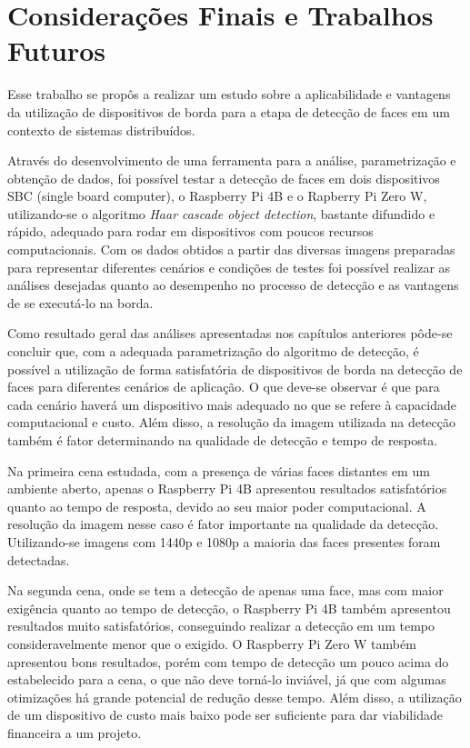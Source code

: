 \chapter{Considerações Finais e Trabalhos \mbox{Futuros}}\label{cap:conclusao}
\thispagestyle{plain}

Esse trabalho se propôs a realizar um estudo sobre a aplicabilidade e vantagens da utilização de dispositivos de borda para a etapa de detecção de faces em um contexto de sistemas distribuídos.

Através do desenvolvimento de uma ferramenta para a análise, parametrização e obtenção de dados, foi possível testar a detecção de faces em dois dispositivos SBC (single board computer), o Raspberry Pi 4B e o Rapberry Pi Zero W, utilizando-se o algoritmo \textit{Haar cascade object detection}, bastante difundido e rápido, adequado para rodar em dispositivos com poucos recursos computacionais. Com os dados obtidos a partir das diversas imagens preparadas para representar diferentes cenários e condições de testes foi possível realizar as análises desejadas quanto ao desempenho no processo de detecção e as vantagens de se executá-lo na borda.

Como resultado geral das análises apresentadas nos capítulos anteriores pôde-se concluir que, com a adequada parametrização do algoritmo de detecção, é possível a utilização de forma satisfatória de dispositivos de borda na detecção de faces para diferentes cenários de aplicação. O que deve-se observar é que para cada cenário haverá um dispositivo mais adequado no que se refere à capacidade computacional e custo. Além disso, a resolução da imagem utilizada na detecção também é fator determinando na qualidade de detecção e tempo de resposta.

Na primeira cena estudada, com a presença de várias faces distantes em um ambiente aberto, apenas o Raspberry Pi 4B apresentou resultados satisfatórios quanto ao tempo de resposta, devido ao seu maior poder computacional. A resolução da imagem nesse caso é fator importante na qualidade da detecção. Utilizando-se imagens com 1440p e 1080p a maioria das faces presentes foram detectadas.

Na segunda cena, onde se tem a detecção de apenas uma face, mas com maior exigência quanto ao tempo de detecção, o Raspberry Pi 4B também apresentou resultados muito satisfatórios, conseguindo realizar a detecção em um tempo consideravelmente menor que o exigido. O Raspberry Pi Zero W também apresentou bons resultados, porém com tempo de detecção um pouco acima do estabelecido para a cena, o que não deve torná-lo inviável, já que com algumas otimizações há grande potencial de redução desse tempo. Além disso, a utilização de um dispositivo de custo mais baixo pode ser suficiente para dar viabilidade financeira a um projeto.

